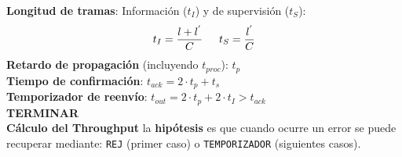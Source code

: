 \documentclass[9pt,landscape]{extarticle}
\begin{document}
\begin{multicols}{3}
%	
%	
	\quad \textbf{Longitud de tramas}: Información ($t_{I}$) y de supervisión ($t_{S}$):
		\begin{equation*}
			t_{I} = \frac{l + l^{'}}{C} \hspace{15 pt} t_{S} = \frac{l^{'}}{C}
		\end{equation*}
	\quad \textbf{Retardo de propagación} (incluyendo $t_{proc}$): $t_{p}$\\
	\quad \textbf{Tiempo de confirmación}: $t_{ack} = 2 \cdot t_{p} + t_{s}$\\
	\quad \textbf{Temporizador de reenvío}: $t_{out} = 2 \cdot t_{p} + 2 \cdot t_{I} > t_{ack}$\\	
	

\textbf{TERMINAR}\\

\textbf{Cálculo del Throughput} la \textbf{hipótesis} es que cuando ocurre un error se puede recuperar mediante: \texttt{REJ} (primer caso) o \texttt{TEMPORIZADOR} (siguientes casos).


\end{multicols}
\end{document}
